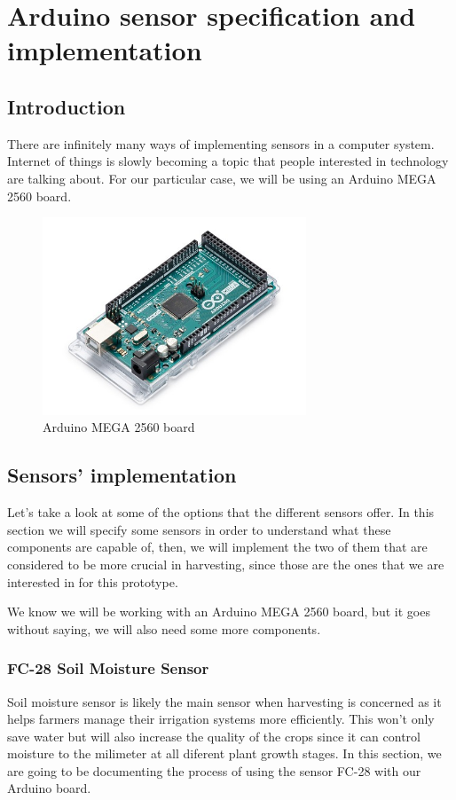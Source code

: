 \chapter{Arduino sensor specification and implementation}\label{cap:implementacion}

\section{Introduction}
There are infinitely many ways of implementing sensors in a computer system. Internet of things is slowly becoming a topic that people interested in technology are talking about. For our particular case, we will be using an Arduino MEGA 2560 board\cite{atmega}.

\begin{figure}[H]
    \centering
    \includegraphics[width=0.7\textwidth]{fig/mega2560.jpg}
    \caption{Arduino MEGA 2560 board}
    \label{fig:mega2560}
\end{figure}



\section{Sensors' implementation}
Let's take a look at some of the options that the different sensors offer. In this section we will specify some sensors in order to understand what these components are capable of, then, we will implement the two of them that are considered to be more crucial in harvesting, since those are the ones that we are interested in for this prototype. 

We know we will be working with an Arduino MEGA 2560 board, but it goes without saying, we will also need some more components. 

\subsection{FC-28 Soil Moisture Sensor}
Soil moisture sensor\cite{fc28} is likely the main sensor when harvesting is concerned as it helps farmers manage their irrigation systems more efficiently. This won't only save water but will also increase the quality of the crops since it can control moisture to the milimeter at all diferent plant growth stages. In this section, we are going to be documenting the process of using the sensor FC-28 with our Arduino board.

